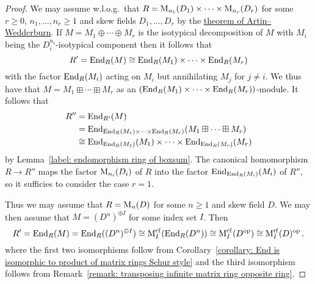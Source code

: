 \begin{proof}
  We may assume w.l.o.g.\ that $R = \operatorname{M}_{n_1}(D_1) \times \dotsb \times \operatorname{M}_{n_r}(D_r)$ for some $r \geq 0$, $n_1, \dotsc, n_r \geq 1$ and skew fields $D_1, \dotsc, D_r$ by the \hyperref[theorem: artin wedderburn theorem]{theorem of Artin--Wedderburn}.
  If $M = M_1 \oplus \dotsb \oplus M_r$ is the isotypical decomposition of $M$ with $M_i$ being the $D_i^{n_i}$-isotypical component then it follows that
  \[
          R'
    =     \operatorname{End}_R(M)
    \cong \operatorname{End}_R(M_1) \times \dotsb \times \operatorname{End}_R(M_r)
  \]
  with the factor $\operatorname{End}_R(M_i)$ acting on $M_i$ but annihilating $M_j$ for $j \neq i$.
  We thus have that $M = M_1 \boxplus \dotsb \boxplus M_r$ as an $(\operatorname{End}_R(M_1) \times \dotsb \times \operatorname{End}_R(M_r))$-module.
  It follows that
  \begin{align*}
            R''
    &=      \operatorname{End}_{R'}(M)  \\
    &=      \operatorname{End}_{\operatorname{End}_R(M_1) \times \dotsb \times \operatorname{End}_R(M_r)}(M_1 \boxplus \dotsb \boxplus M_r) \\
    &\cong  \operatorname{End}_{\operatorname{End}_R(M_1)}(M_1) \times \dotsb \times \operatorname{End}_{\operatorname{End}_R(M_r)}(M_r)
  \end{align*}
  by Lemma~\ref{label: endomorphism ring of boxsum}.
  The canonical homomorphism $R \to R''$ maps the factor $\operatorname{M}_{n_i}(D_i)$ of $R$ into the factor $\operatorname{End}_{\operatorname{End}_R(M_i)}(M_i)$ of $R''$, so it sufficies to consider the case $r = 1$.
  
  Thus we may assume that $R = \operatorname{M}_n(D)$ for some $n \geq 1$ and skew field $D$.
  We may then assume that $M = (D^n)^{\oplus I}$ for some index set $I$.
  Then
  \[
          R'
    =     \operatorname{End}_R(M)
    =     \operatorname{End}_R( (D^n)^{\oplus I} )
    \cong \operatorname{M}_I^{{\operatorname{cf}}}( \operatorname{End}_R( D^n ) )
    \cong \operatorname{M}_I^{{\operatorname{cf}}}( D^{\operatorname{op}} )
    \cong \operatorname{M}_I^{{\operatorname{rf}}}( D )^{\operatorname{op}} \,.
  \]
  where the first two isomorphisms follow from Corollary~\ref{corollary: End is isomorphic to product of matrix rings Schur style} and the third isomorphism follows from Remark~\ref{remark: transposing infinite matrix ring opposite ring}.
  

\end{proof}
